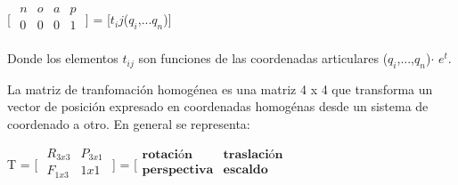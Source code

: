 \documentclass[letter,openright,12pt,spanish]{report}
\begin{document}
\begin{center}
[
$\begin{matrix}
	n & o & a & p\\
	0 & 0 & 0 & 1\\
\end{matrix}$ ] = [$t_ij$($q_i$,...$q_n$)]
\end{center}

Donde los elementos $t_{ij}$ son funciones de las coordenadas articulares ($q_i$,...,$q_n$)$\cdot $ $e^t$.

La matriz de tranfomaci\'on homog\'enea es una matriz 4 x 4 que transforma un vector de posici\'on expresado en coordenadas homog\'enas desde un sistema de coordenado a otro. En general se representa:

\begin{center}
T = [ $\begin{matrix}
	R_{3x3} & P_{3x1}\\
	F_{1x3} & 1x1\\
\end{matrix}$ ] = [$\begin{matrix}
	\textbf{rotaci\'on} & \textbf{traslaci\'on}\\
	\textbf{perspectiva} & \textbf{escaldo}\\
\end{matrix}$
\end{center}
\end{document}

